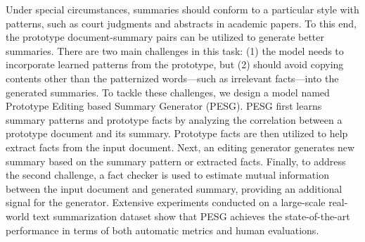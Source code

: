 Under special circumstances, summaries should conform to a particular style with patterns, such as court judgments and abstracts in academic papers.
To this end, the prototype document-summary pairs can be utilized to generate better summaries.
There are two main challenges in this task:
(1) the model needs to incorporate learned patterns from the prototype, but (2) should avoid copying contents other than the patternized words---such as irrelevant facts---into the generated summaries.
To tackle these challenges, we design a model named Prototype Editing based Summary Generator (PESG).
PESG first learns summary patterns and prototype facts by analyzing the correlation between a prototype document and its summary.
Prototype facts are then utilized to help extract facts from the input document.
Next, an editing generator generates new summary based on the summary pattern or extracted facts. 
Finally, to address the second challenge, a fact checker is used to estimate mutual information between the input document and generated summary, providing an additional signal for the generator.
Extensive experiments conducted on a large-scale real-world text summarization dataset show that PESG achieves the state-of-the-art performance in terms of both automatic metrics and human evaluations.